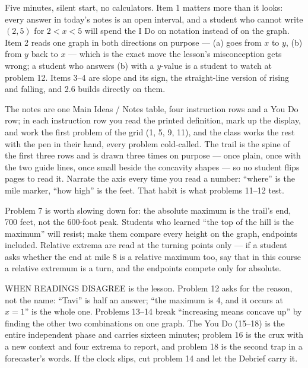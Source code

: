 \documentclass[10pt]{article}
\begin{document}
\begin{teachernote}[Warm-Up]
Five minutes, silent start, no calculators. Item 1 matters more than it looks: every answer in
today's notes is an open interval, and a student who cannot write $(2, 5)$ for $2 < x < 5$ will
spend the I Do on notation instead of on the graph. Item 2 reads one graph in both directions on
purpose --- (a) goes from $x$ to $y$, (b) from $y$ back to $x$ --- which is the exact move the
lesson's misconception gets wrong; a student who answers (b) with a $y$-value is a student to
watch at problem 12. Items 3--4 are slope and its sign, the straight-line version of rising and
falling, and 2.6 builds directly on them.
\end{teachernote}

\begin{teachernote}
The notes are one Main Ideas / Notes table, four instruction rows and a You Do row; in each
instruction row you read the printed definition, mark up the display, and work the first problem
of the grid (1, 5, 9, 11), and the class works the rest with the pen in their hand, every problem
cold-called. The trail is the spine of the first three rows and is drawn three times on purpose
--- once plain, once with the two guide lines, once small beside the concavity shapes --- so no
student flips pages to read it. Narrate the axis every time you read a number: ``where'' is the
mile marker, ``how high'' is the feet. That habit is what problems 11--12 test.

Problem 7 is worth slowing down for: the absolute maximum is the trail's end, 700 feet, not the
600-foot peak. Students who learned ``the top of the hill is the maximum'' will resist; make them
compare every height on the graph, endpoints included. Relative extrema are read at the turning
points only --- if a student asks whether the end at mile 8 is a relative maximum too, say that
in this course a relative extremum is a turn, and the endpoints compete only for absolute.

WHEN READINGS DISAGREE is the lesson. Problem 12 asks for the reason, not the name: ``Tavi'' is
half an answer; ``the maximum is 4, and it occurs at $x = 1$'' is the whole one. Problems 13--14
break ``increasing means concave up'' by finding the other two combinations on one graph. The
You Do (15--18) is the entire independent phase and carries sixteen minutes; problem 16 is the
crux with a new context and four extrema to report, and problem 18 is the second trap in a
forecaster's words. If the clock slips, cut problem 14 and let the Debrief carry it.
\end{teachernote}
\end{document}
